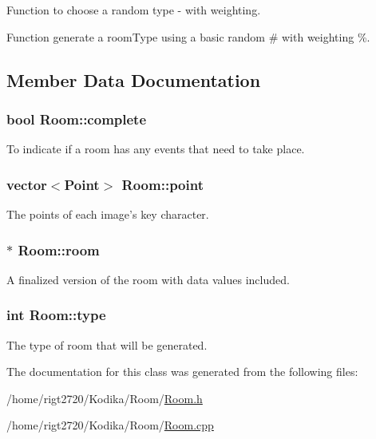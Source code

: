 Function to choose a random type -\/ with weighting. 

Function generate a room\-Type using a basic random \# with weighting \%. 

\subsection{Member Data Documentation}
\hypertarget{classRoom_a27ea6606438ab66c131e164eb19b5f5f}{
\subsubsection[{complete}]{\setlength{\rightskip}{0pt plus 5cm}bool Room\-::complete}}\label{classRoom_a27ea6606438ab66c131e164eb19b5f5f}


To indicate if a room has any events that need to take place. 

\hypertarget{classRoom_aa5729228bac2fa43e1317655ec6dc5b7}{
\subsubsection[{point}]{\setlength{\rightskip}{0pt plus 5cm}vector$<${\bf Point}$>$ Room\-::point}}\label{classRoom_aa5729228bac2fa43e1317655ec6dc5b7}


The points of each image's key character. 

\hypertarget{classRoom_a4d493bf25d07a6880b399adedd3a10e6}{
\subsubsection[{room}]{$\ast$ Room\-::room\hspace{0.3cm}{\ttfamily [private]}}}\label{classRoom_a4d493bf25d07a6880b399adedd3a10e6}


A finalized version of the room with data values included. 

\hypertarget{classRoom_a209eba22dbc85cb190906de3f0363e59}{
\subsubsection[{type}]{\setlength{\rightskip}{0pt plus 5cm}int Room\-::type\hspace{0.3cm}{\ttfamily [private]}}}\label{classRoom_a209eba22dbc85cb190906de3f0363e59}


The type of room that will be generated. 



The documentation for this class was generated from the following files\-:\begin{DoxyCompactItemize}
\item 
/home/rigt2720/\-Kodika/\-Room/\hyperlink{Room_8h}{Room.\-h}\item 
/home/rigt2720/\-Kodika/\-Room/\hyperlink{Room_8cpp}{Room.\-cpp}\end{DoxyCompactItemize}
